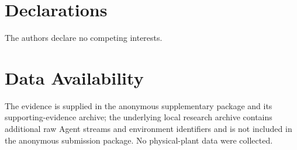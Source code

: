 \documentclass[journal]{IEEEtran}
\begin{document}
\IEEEpeerreviewmaketitle









\section*{Declarations}
The authors declare no competing interests.

\section*{Data Availability}
The evidence is supplied in the anonymous supplementary package and its supporting-evidence archive; the underlying local research archive contains additional raw Agent streams and environment identifiers and is not included in the anonymous submission package. No physical-plant data were collected.



\end{document}
